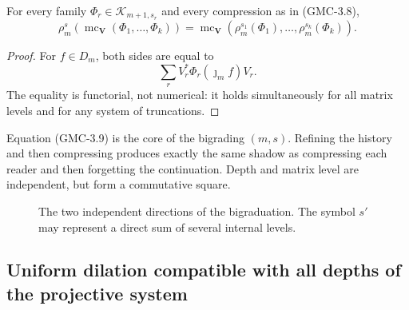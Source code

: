 \begin{theorem}
\label{p12-83-c22-s4:gmc:thm:conmutacion-ms}
For every family $\Phi_r\in\mathcal K_{m+1,s_r}$ and every compression as in
\textup{(GMC-3.8)},
\[
 \rho_m^s\!\left(
   \operatorname{mc}_{\boldsymbol V}(\Phi_1,\ldots,\Phi_k)
 \right)
 =
 \operatorname{mc}_{\boldsymbol V}\!\left(
   \rho_m^{s_1}(\Phi_1),\ldots,\rho_m^{s_k}(\Phi_k)
 \right).
 \tag{GMC-3.9}
\]
\end{theorem}

\begin{proof}
For $f\in D_m$, both sides are equal to
\[
 \sum_rV_r^*\Phi_r(\jmath_m f)V_r.
\]
The equality is functorial, not numerical: it holds simultaneously for all
matrix levels and for any system of truncations.
\end{proof}

\begin{bridgebox}
Equation \textup{(GMC-3.9)} is the core of the bigrading $(m,s)$. Refining the
history and then compressing produces exactly the same shadow as
compressing each reader and then forgetting the continuation. Depth and
matrix level are independent, but form a commutative square.
\end{bridgebox}

\begin{figure}[H]
\centering
{}
\caption{The two independent directions of the bigraduation. The symbol
$s'$ may represent a direct sum of several internal levels.}
\label{p12-83-c22-s4:gmc:fig:cuadrado-ms}
\end{figure}

\subsection{Uniform dilation compatible with all depths of the projective system}

